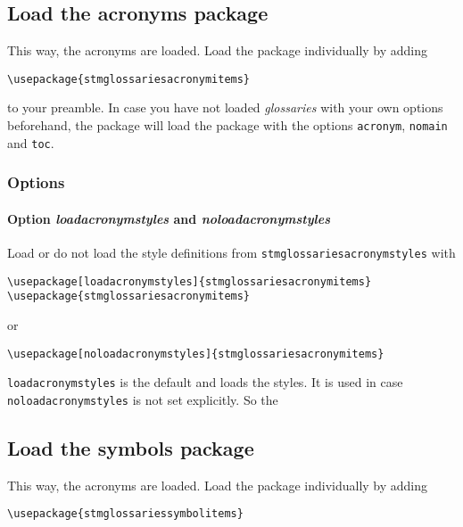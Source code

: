 \documentclass{scrartcl}
\begin{document}
\subsection{Load the acronyms package}
\label{sec:usage:preamble:acronymspackage}

This way, the acronyms are loaded. Load the package individually by adding

\begin{verbatim}
\usepackage{stmglossariesacronymitems}
\end{verbatim}

to your preamble. In case you have not loaded \textit{glossaries} with your own options beforehand, the package will load the package with the options \texttt{acronym}, \texttt{nomain} and \texttt{toc}.

\subsubsection{Options}

\paragraph{Option \protect\textit{loadacronymstyles} and \protect\textit{noloadacronymstyles}}

Load or do not load the style definitions from \texttt{stmglossariesacronymstyles} with

\begin{verbatim}
\usepackage[loadacronymstyles]{stmglossariesacronymitems}
\usepackage{stmglossariesacronymitems}
\end{verbatim}

or

\begin{verbatim}
\usepackage[noloadacronymstyles]{stmglossariesacronymitems}
\end{verbatim}

\texttt{loadacronymstyles} is the default and loads the styles. It is used in case \texttt{noloadacronymstyles} is not set explicitly. So the 

\subsection{Load the symbols package}
\label{sec:usage:preamble:symbolspackage}

This way, the acronyms are loaded. Load the package individually by adding

\begin{verbatim}
\usepackage{stmglossariessymbolitems}
\end{verbatim}
\end{document}
